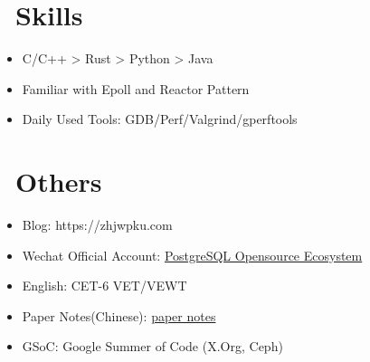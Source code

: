 \documentclass{resume}
\begin{document}
\section{\faWrench\ Skills}
\begin{itemize}[parsep=0.5ex]
  \item C/C++ > Rust > Python > Java
  \item Familiar with Epoll and Reactor Pattern
  \item Daily Used Tools: GDB/Perf/Valgrind/gperftools
\end{itemize}

\section{\faCogs\ Others}
\begin{itemize}[parsep=0.5ex]
  \item Blog: https://zhjwpku.com
  \item Wechat Official Account: \href{https://pg-x.github.io/images/wechat_qrcode.jpg}{PostgreSQL Opensource Ecosystem}
  \item English: CET-6 VET/VEWT
  \item Paper Notes(Chinese): \href{https://paper-notes.zhjwpku.com/}{paper notes}
  \item GSoC: Google Summer of Code (X.Org, Ceph)
\end{itemize}
\end{document}
